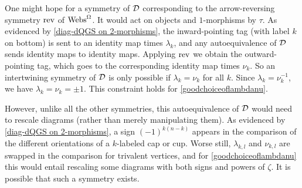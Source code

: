 \begin{remark} One might hope for a symmetry of $\mathcal{D}$ corresponding to the arrow-reversing symmetry $\operatorname{rev}$ of $\operatorname{Webs}^{\Omega}$. It would act on objects and $1$-morphisms by $\tau$. As evidenced by \eqref{diag-dQGS on 2-morphisms}, the inward-pointing tag (with label $k$ on bottom) is sent to an identity map times $\lambda_k$, and any autoequivalence of $\mathcal{D}$ sends identity maps to identity maps. Applying $\operatorname{rev}$ we obtain the outward-pointing tag, which goes to the corresponding identity map times $\nu_k$. So an intertwining symmetry of $\mathcal{D}$ is only possible if $\lambda_k = \nu_k$ for all $k$.  Since $\lambda_k = \nu_k^{-1}$, we have $\lambda_k = \nu_k = \pm 1$. This constraint holds for \cref{goodchoiceoflambdanu}.

However, unlike all the other symmetries, this autoequivalence of $\mathcal{D}$ would need to rescale diagrams (rather than merely manipulating them). As evidenced by \eqref{diag-dQGS on 2-morphisms}, a sign $(-1)^{k(n-k)}$ appears in the comparison of the different orientations of a $k$-labeled cap or cup. Worse still, $\lambda_{k,l}$ and $\nu_{k,l}$ are swapped in the comparison for trivalent vertices, and for \cref{goodchoiceoflambdanu} this would entail rescaling some diagrams with both signs and powers of $\zeta$. It is possible that such a symmetry exists.

\end{remark}

